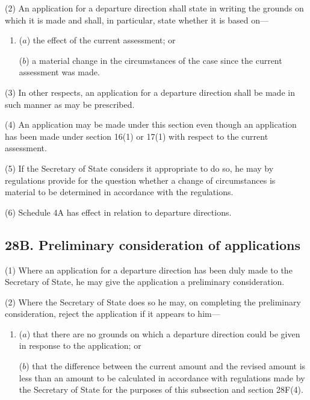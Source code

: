 \documentclass[12pt,a4paper]{article}
\begin{document}
(2) An application for a departure direction shall state in writing the grounds on which it is made and shall, in particular, state whether it is based on—
\begin{enumerate}\item[]
($a$) the effect of the current assessment; or

($b$) a material change in the circumstances of the case since the current assessment was made.
\end{enumerate}

(3) In other respects, an application for a departure direction shall be made in such manner as may be prescribed.

%

(4) An application may be made under this section even though an application has been made under section 16(1) or 17(1) with respect to the current assessment.

(5) If the Secretary of State considers it appropriate to do so, he may by regulations provide for the question whether a change of circumstances is material to be determined in accordance with the regulations.

(6) Schedule 4A has effect in relation to departure directions.


\subsection{28B. Preliminary consideration of applications}

(1) Where an application for a departure direction has been duly made to the Secretary of State, he may give the application a preliminary consideration.

(2) Where the Secretary of State does so he may, on completing the preliminary consideration, reject the application if it appears to him—
\begin{enumerate}\item[]
($a$) that there are no grounds on which a departure direction could be given in response to the application; or

($b$) that the difference between the current amount and the revised amount is less than an amount to be calculated in accordance with regulations made by the Secretary of State for the purposes of this subsection and section 28F(4).
\end{enumerate}
\end{document}
